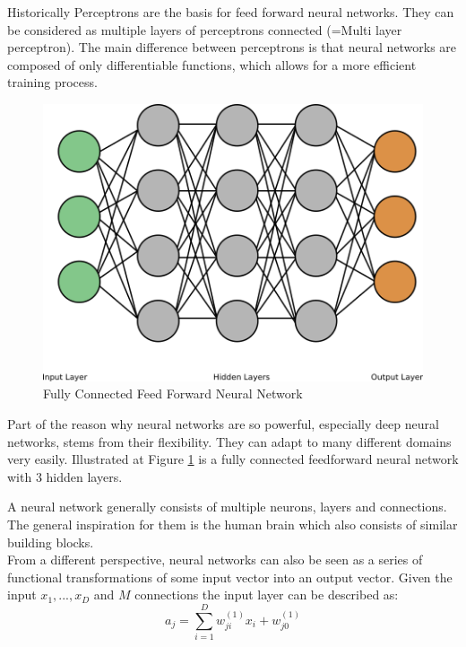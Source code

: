 \documentclass[draft,final,oneside]{vutinfth} %
\begin{document}
Historically Perceptrons are the basis for feed forward neural networks. They can be considered as multiple layers of perceptrons connected (=Multi layer perceptron). The main difference between perceptrons is that neural networks are composed of only differentiable functions, which allows for a more efficient training process.

\begin{figure}[ht]
	\centering
  	\includegraphics[width=1\textwidth]{graphics/simple_neural_network.png}
	\caption{Fully Connected Feed Forward Neural Network}
	\label{fig:feedforward}
\end{figure}

Part of the reason why neural networks are so powerful, especially deep neural networks, stems from their flexibility. They can adapt to many different domains very easily. Illustrated at Figure \ref{fig:feedforward} is a fully connected feedforward neural network with 3 hidden layers. 

A neural network generally consists of multiple neurons, layers and connections. The general inspiration for them is the human brain which also consists of similar building blocks. \\

From a different perspective, neural networks can also be seen as a series of functional transformations of some input vector into an output vector. Given the input $x_1, ..., x_D$ and $M$ connections the input layer can be described as:
\begin{equation}
a_j = \sum_{i=1}^{D} w_{ji}^{(1)}x_i + w_{j0}^{(1)}
\end{equation}
\end{document}
